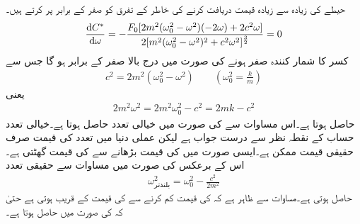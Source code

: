 حیطے کی زیادہ سے زیادہ قیمت دریافت کرنے کی خاطر  کے تفرق کو صفر کے برابر  پر کرتے ہیں۔
\begin{align*}
\frac{\dif C^*}{\dif \omega}=-\frac{F_0[2m^2(\omega_0^2-\omega^2)(-2\omega)+2c^2\omega]}{2[m^2(\omega_0^2-\omega^2)^2+c^2\omega^2]^{\frac{3}{2}}}=0
\end{align*}
کسر کا شمار کنندہ صفر ہونے کی صورت میں درج بالا صفر کے برابر ہو گا جس سے
\begin{align}
c^2=2m^2(\omega_0^2-\omega^2)\quad \quad (\omega_0^2=\frac{k}{m})
\end{align}
یعنی
\begin{align}\label{مساوات_سادہ_دو_عملی_گمک_تعدد_الف}
2m^2\omega^2=2m^2\omega_0^2-c^2=2mk-c^2
\end{align}
حاصل ہوتا ہے۔اس مساوات سے   کی صورت میں خیالی تعدد  حاصل ہوتا ہے۔خیالی تعدد حساب کے نقطہ نظر سے درست جواب  ہے لیکن عملی دنیا میں تعدد کی قیمت صرف حقیقی قیمت ممکن ہے۔ایسی صورت میں  کی قیمت بڑھانے سے  کی قیمت گھٹتی ہے۔اس کے برعکس  کی صورت میں  مساوات  سے حقیقی تعدد 
\begin{align}\label{مساوات_سادہ_دو_عملی_گمک_تعدد_ب}
\omega^2_{\text{بلندتر}}=\omega_0^2-\frac{c^2}{2m^2}
\end{align}
حاصل ہوتی ہے۔مساوات  سے ظاہر ہے کہ  کی قیمت کم کرنے سے  کی قیمت  کے قریب ہوتی ہے حتیٰ کہ  کی صورت میں  حاصل ہوتا ہے۔
